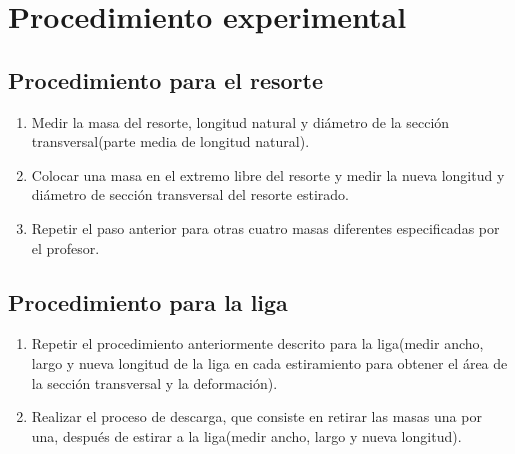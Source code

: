 \section{Procedimiento experimental}
\subsection{Procedimiento para el resorte}
\begin{enumerate}
  \item Medir la masa del resorte, longitud natural y diámetro de la sección transversal(parte media de longitud natural).
\end{enumerate}

\begin{enumerate}
  \setcounter{enumi}{1}
  \item Colocar una masa en el extremo libre del resorte y medir la nueva longitud y diámetro de sección transversal del resorte estirado.
  \item Repetir el paso anterior para otras cuatro masas diferentes especificadas por el profesor.
\end{enumerate}

\subsection{Procedimiento para la liga}
\begin{enumerate}
  \item Repetir el procedimiento anteriormente descrito para la liga(medir ancho, largo y nueva longitud de la liga en cada estiramiento para obtener el área de la sección transversal y la deformación).
  \item Realizar el proceso de descarga, que consiste en retirar las masas una por una, después de estirar a la liga(medir ancho, largo y nueva longitud).
\end{enumerate}

